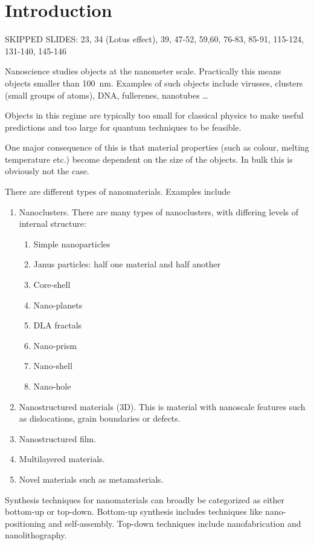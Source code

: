 \chapter{Introduction}

SKIPPED SLIDES: 23, 34 (Lotus effect), 39, 47-52, 59,60, 76-83, 85-91, 115-124, 131-140, 145-146

Nanoscience studies objects at the nanometer scale. Practically this means objects smaller than \SI{100}{nm}. Examples of such objects include virusses, clusters (small groups of atoms), DNA, fullerenes, nanotubes \ldots

Objects in this regime are typically too small for classical physics to make useful predictions and too large for quantum techniques to be feasible.

One major consequence of this is that material properties (such as colour, melting temperature etc.) become dependent on the size of the objects. In bulk this is obviously not the case.

There are different types of nanomaterials. Examples include
\begin{enumerate}
\item Nanoclusters. There are many types of nanoclusters, with differing levels of internal structure:
\begin{enumerate}
\item Simple nanoparticles
\item Janus particles: half one material and half another
\item Core-shell
\item Nano-planets
\item DLA fractals
\item Nano-prism
\item Nano-shell
\item Nano-hole
\end{enumerate}
\item Nanostructured materials (3D). This is material with nanoscale features such as dislocations, grain boundaries or defects.
\item Nanostructured film.
\item Multilayered materials.
\item Novel materials such as metamaterials.
\end{enumerate}

Synthesis techniques for nanomaterials can broadly be categorized as either bottom-up or top-down. Bottom-up synthesis includes techniques like nano-positioning and self-assembly. Top-down techniques include nanofabrication and nanolithography.

